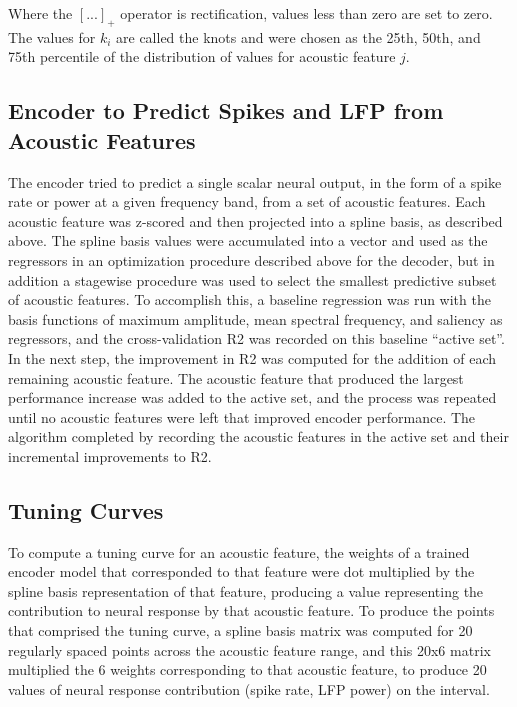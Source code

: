 Where the $[...]_+$ operator is rectification, values less than zero are set to zero. The values for $k_i$ are called the knots and were chosen as the 25th, 50th, and 75th percentile of the distribution of values for acoustic feature $j$.


\subsection{Encoder to Predict Spikes and LFP from Acoustic Features}

The encoder tried to predict a single scalar neural output, in the form of a spike rate or power at a given frequency band, from a set of acoustic features. Each acoustic feature was z-scored and then projected into a spline basis, as described above. The spline basis values were accumulated into a vector and used as the regressors in an optimization procedure described above for the decoder, but in addition a stagewise procedure was used to select the smallest predictive subset of acoustic features. To accomplish this, a baseline regression was run with the basis functions of maximum amplitude, mean spectral frequency, and saliency as regressors, and the cross-validation R2 was recorded on this baseline ``active set''. In the next step, the improvement in R2 was computed for the addition of each remaining acoustic feature. The acoustic feature that produced the largest performance increase was added to the active set, and the process was repeated until no acoustic features were left that improved encoder performance. The algorithm completed by recording the acoustic features in the active set and their incremental improvements to R2.


\subsection{Tuning Curves}

To compute a tuning curve for an acoustic feature, the weights of a trained encoder model that corresponded to that feature were dot multiplied by the spline basis representation of that feature, producing a value representing the contribution to neural response by that acoustic feature. To produce the points that comprised the tuning curve, a spline basis matrix was computed for 20 regularly spaced points across the acoustic feature range, and this 20x6 matrix multiplied the 6 weights corresponding to that acoustic feature, to produce 20 values of neural response contribution (spike rate, LFP power) on the interval.


